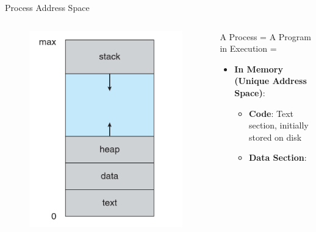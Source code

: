 \begin{frame}[fragile]{Process Address Space}
	\begin{columns}
		\begin{column}{0.3\textwidth}
			\begin{figure}[H]
				\centering
				\includegraphics[width=\textwidth]{day3/img/process-layout.png}
			\end{figure}
		\end{column}
		\begin{column}{0.7\textwidth}
			A Process = A Program in Execution =
			\begin{itemize}
				\item<1-> \textbf{In Memory (Unique Address Space)}:
				      \begin{itemize}
					      \item \textbf{Code}: Text section, initially stored on disk
					      \item<2-> \textbf{Data Section}:
					            \begin{itemize}

\end{itemize}
\end{itemize}
\end{itemize}
\end{column}
\end{columns}
\end{frame}
